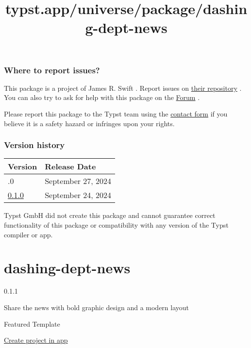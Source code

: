 \subsubsection{Where to report issues?}\label{where-to-report-issues}

This package is a project of James R. Swift . Report issues on
\href{https://www.github.com/jamesrswift/frackable}{their repository} .
You can also try to ask for help with this package on the
\href{https://forum.typst.app}{Forum} .

Please report this package to the Typst team using the
\href{https://typst.app/contact}{contact form} if you believe it is a
safety hazard or infringes upon your rights.

\label{versions}
\subsubsection{Version history}\label{version-history}

\begin{longtable}[]{@{}ll@{}}
\toprule\noalign{}
Version & Release Date \\
\midrule\noalign{}
\endhead
\bottomrule\noalign{}
\endlastfoot
0.2.0 & September 27, 2024 \\
\href{https://typst.app/universe/package/frackable/0.1.0/}{0.1.0} &
September 24, 2024 \\
\end{longtable}

Typst GmbH did not create this package and cannot guarantee correct
functionality of this package or compatibility with any version of the
Typst compiler or app.


\title{typst.app/universe/package/dashing-dept-news}

\label{banner}
\label{template-thumbnail}

\section{dashing-dept-news}\label{dashing-dept-news}

{ 0.1.1 }

Share the news with bold graphic design and a modern layout

{ } Featured Template

\href{/app?template=dashing-dept-news&version=0.1.1}{Create project in
app}

